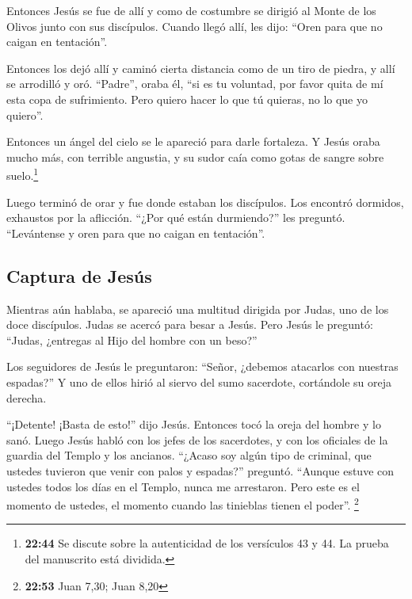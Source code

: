  Entonces Jesús se fue de allí y como de costumbre se
dirigió al Monte de los Olivos junto con sus discípulos. 
Cuando llegó allí, les dijo: ``Oren para que no caigan en tentación''.

 Entonces los dejó allí y caminó cierta distancia como de
un tiro de piedra, y allí se arrodilló y oró.  ``Padre'',
oraba él, ``si es tu voluntad, por favor quita de mí esta copa de
sufrimiento. Pero quiero hacer lo que tú quieras, no lo que yo quiero''.

 Entonces un ángel del cielo se le apareció para darle
fortaleza.  Y Jesús oraba mucho más, con terrible
angustia, y su sudor caía como gotas de sangre sobre suelo.\footnote{\textbf{22:44}
  Se discute sobre la autenticidad de los versículos 43 y 44. La prueba
  del manuscrito está dividida.}

 Luego terminó de orar y fue donde estaban los
discípulos. Los encontró dormidos, exhaustos por la aflicción.
 ``¿Por qué están durmiendo?'' les preguntó. ``Levántense
y oren para que no caigan en tentación''.

\hypertarget{captura-de-jesuxfas}{%
\subsection{Captura de Jesús}\label{captura-de-jesuxfas}}

 Mientras aún hablaba, se apareció una multitud dirigida
por Judas, uno de los doce discípulos. Judas se acercó para besar a
Jesús.  Pero Jesús le preguntó: ``Judas, ¿entregas al
Hijo del hombre con un beso?''

 Los seguidores de Jesús le preguntaron: ``Señor,
¿debemos atacarlos con nuestras espadas?''  Y uno de
ellos hirió al siervo del sumo sacerdote, cortándole su oreja derecha.

 ``¡Detente! ¡Basta de esto!'' dijo Jesús. Entonces tocó
la oreja del hombre y lo sanó.  Luego Jesús habló con los
jefes de los sacerdotes, y con los oficiales de la guardia del Templo y
los ancianos. ``¿Acaso soy algún tipo de criminal, que ustedes tuvieron
que venir con palos y espadas?'' preguntó.  ``Aunque
estuve con ustedes todos los días en el Templo, nunca me arrestaron.
Pero este es el momento de ustedes, el momento cuando las tinieblas
tienen el poder''. \footnote{\textbf{22:53} Juan 7,30; Juan 8,20}


